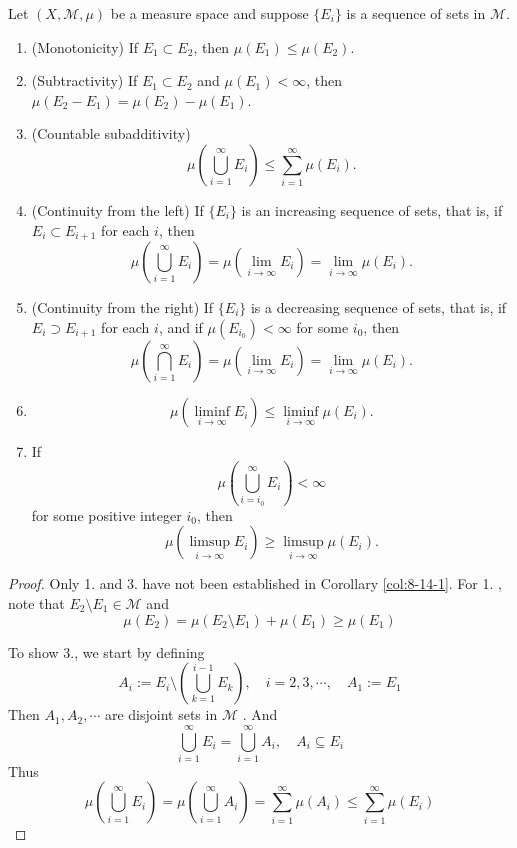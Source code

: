 \documentclass[../main.tex]{subfiles}
\begin{document}
\begin{theorem}{}{}
Let $(X, \mathcal{M}, \mu)$ be a measure space and suppose $\{E_i\}$ is a sequence of sets in $\mathcal{M}$.
\begin{enumerate}
    \item (Monotonicity) If $E_1 \subset E_2$, then $\mu(E_1) \le \mu(E_2)$.
    \item (Subtractivity) If $E_1 \subset E_2$ and $\mu(E_1) < \infty$, then $\mu(E_2 - E_1) = \mu(E_2) - \mu(E_1)$.
    \item (Countable subadditivity)
    \[
        \mu(\bigcup_{i=1}^{\infty} E_i) \le \sum_{i=1}^{\infty} \mu(E_i).
    \]
    \item (Continuity from the left) If $\{E_i\}$ is an increasing sequence of sets, that is, if $E_i \subset E_{i+1}$ for each $i$, then
    \[
        \mu(\bigcup_{i=1}^{\infty} E_i) = \mu(\lim_{i \to \infty} E_i) = \lim_{i \to \infty} \mu(E_i).
    \]
    \item (Continuity from the right) If $\{E_i\}$ is a decreasing sequence of sets, that is, if $E_i \supset E_{i+1}$ for each $i$, and if $\mu(E_{i_0}) < \infty$ for some $i_0$, then
    \[
        \mu(\bigcap_{i=1}^{\infty} E_i) = \mu(\lim_{i \to \infty} E_i) = \lim_{i \to \infty} \mu(E_i).
    \]
    \item 
    \[
        \mu(\liminf_{i \to \infty} E_i) \le \liminf_{i \to \infty} \mu(E_i).
    \]
    \item If
    \[
        \mu(\bigcup_{i=i_0}^{\infty} E_i) < \infty
    \]
    for some positive integer $i_0$, then
    \[
        \mu(\limsup_{i \to \infty} E_i) \ge \limsup_{i \to \infty} \mu(E_i).
    \]
\end{enumerate}
\end{theorem}

\begin{proof}
    Only 1. and 3. have not been established in Corollary \ref{col:8-14-1}. For 1. , note that \(  E_2\setminus E_1  \in \mathcal{M}\) and \[
    \mu \left( E_2 \right)= \mu \left( E_2\setminus E_1 \right)+ \mu \left( E_1 \right)\ge  \mu \left( E_1 \right)    
    \]  

    To show 3., we start by defining \[
    A_{i}:=  E_{i}\setminus \left( \bigcup _{k= 1}^{i-1} E_{k}\right),\quad i= 2,3,\cdots ,\quad A_1:= E_1 
    \]Then \( A_1,A_2,\cdots    \) are disjoint sets in \(  \mathcal{M}  \) .  And \[
    \bigcup _{i= 1}^{\infty}E_{i}= \bigcup _{i= 1}^{\infty}A_{i},\quad A_{i}\subseteq E_{i}
    \]Thus \[
    \mu \left( \bigcup _{i= 1}^{\infty}E_{i}\right)= \mu \left( \bigcup _{i= 1}^{\infty}A_{i} \right)= \sum _{i= 1}^{\infty}\mu \left( A_{i} \right)\le    \sum _{i= 1}^{\infty}\mu \left( E_{i} \right) 
    \]
\end{proof}
\end{document}

